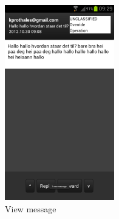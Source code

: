 \begin{figure}[h!]
\begin{center}
\includegraphics{viewmessage}
\end{center}
\caption{View message} \label{fig:viewmessagegui}
\end{figure}

\newpage

